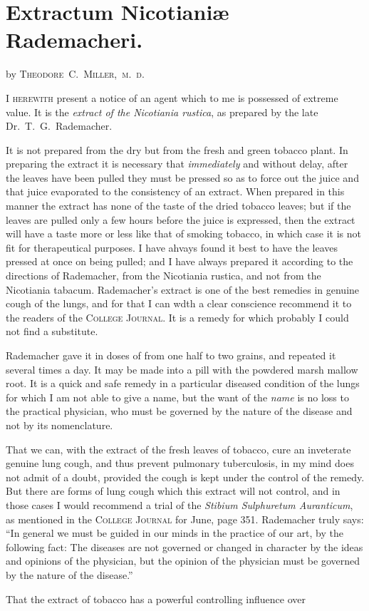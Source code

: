 \section*{Extractum Nicotianiæ Rademacheri.}

by \textsc{Theodore~C.~Miller,\ m.~d.}

\lettrine[lines=1]{}{I herewith} present a notice of an agent which to me is possessed of
extreme value. It is the \emph{extract of the Nicotiania rustica}, as prepared
by the late Dr.~T.~G.\ Rademacher.

It is not prepared from the dry but from the fresh and green tobacco
plant. In preparing the extract it is necessary that \emph{immediately} and
without delay, after the leaves have been pulled they must be pressed
so as to force out the juice and that juice evaporated to the consistency
of an extract. When prepared in this manner the extract has none of
the taste of the dried tobacco leaves; but if the leaves are pulled only
a few hours before the juice is expressed, then the extract will have a
taste more or less like that of smoking tobacco, in which case it is not
fit for therapeutical purposes. I have ahvays found it best to have the
leaves pressed at once on being pulled; and I have always prepared it
according to the directions of Rademacher, from the Nicotiania rustica,
and not from the Nicotiania tabacum. Rademacher's extract is one of
the best remedies in genuine cough of the lungs, and for that I can wdth
a clear conscience recommend it to the readers of the \textsc{College Journal}.
It is a remedy for which probably I could not find a substitute.

Rademacher gave it in doses of from one half to two grains, and repeated
it several times a day. It may be made into a pill with the
powdered marsh mallow root. It is a quick and safe remedy in a particular
diseased condition of the lungs for which I am not able to give
a name, but the want of the \emph{name} is no loss to the practical physician,
who must be governed by the nature of the disease and not by its
nomenclature.

That we can, with the extract of the fresh leaves of tobacco, cure an
inveterate genuine lung cough, and thus prevent pulmonary tuberculosis,
in my mind does not admit of a doubt, provided the cough is kept under
the control of the remedy. But there are forms of lung cough which
this extract will not control, and in those cases I would recommend a
trial of the \emph{Stibium Sulphuretum Auranticum}, as mentioned in the
\textsc{College Journal} for June, page 351. Rademacher truly says: ``In
general we must be guided in our minds in the practice of our art, by
the following fact: The diseases are not governed or changed in character
by the ideas and opinions of the physician, but the opinion of
the physician must be governed by the nature of the disease.''

That the extract of tobacco has a powerful controlling influence over\endinput
